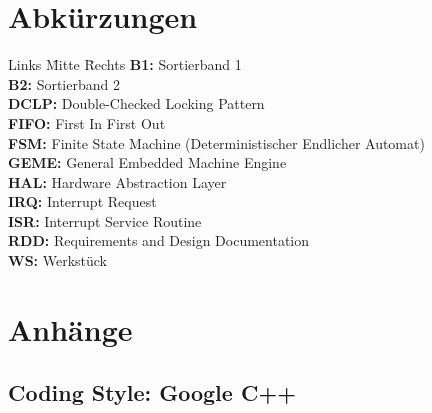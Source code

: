 \documentclass[oneside,a4paper,titlepage]{scrartcl}              %
\begin{document}
\section{Abkürzungen}
\begin{tabbing}
  Links \= Mitte \= Rechts \kill
  \textbf{B1:}   \> \> Sortierband 1\\
  \textbf{B2:}   \> \> Sortierband 2\\
  \textbf{DCLP:} \> \> Double-Checked Locking Pattern\\
  \textbf{FIFO:} \> \> First In First Out\\
  \textbf{FSM:}  \> \> Finite State Machine (Deterministischer Endlicher Automat)\\
  \textbf{GEME:} \> \> General Embedded Machine Engine\\
  \textbf{HAL:}  \> \> Hardware Abstraction Layer\\
  \textbf{IRQ:}  \> \> Interrupt Request\\
  \textbf{ISR:}  \> \> Interrupt Service Routine\\
  \textbf{RDD:}  \> \> Requirements and Design Documentation\\
  \textbf{WS:}   \> \> Werkstück\\
\end{tabbing}

\newpage

\section{Anhänge}

\subsection{Coding Style: Google C++}

\end{document}

